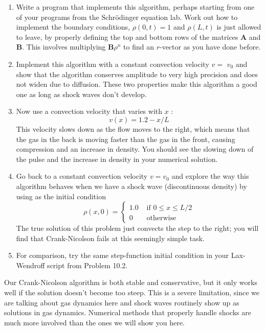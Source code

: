 \documentclass{book}
\theoremstyle{plain}
\theoremstyle{definition}
\numberwithin{exm}{chapter}
\theoremstyle{remark}
\theoremstyle{summary}
\theoremstyle{overview}
\begin{document}
\begin{enumerate}[label=(\alph*)]
\item  Write a program that implements this algorithm, perhaps starting from one of your programs from the Schr{\"o}dinger equation lab. Work out how to implement the boundary conditions, $\rho(0, t)=1$ and $\rho(L, t)$ is just allowed to leave, by properly defining the top and bottom rows of the matrices $\mathbf{A}$ and $\mathbf{B}$. This involves multiplying $\mathbf{B} \rho^{n}$ to find an $r$-vector as you have done before.
\item  Implement this algorithm with a constant convection velocity $v=$ $v_{0}$ and show that the algorithm conserves amplitude to very high precision and does not widen due to diffusion. These two properties make this algorithm a good one as long as shock waves don\rq t develop.
\item Now use a convection velocity that varies with $x$ :
\begin{equation}\label{eq:1019}
v(x)=1.2-x / L
\end{equation}
This velocity slows down as the flow moves to the right, which means
that the gas in the back is moving faster than the gas in the front,
causing compression and an increase in density. You should see the
slowing down of the pulse and the increase in density in your numerical solution.
\item Go back to a constant convection velocity $v = v_0$ and explore the way
this algorithm behaves when we have a shock wave (discontinuous
density) by using as the initial condition
\begin{equation}\label{eq:1020}
\rho(x, 0)= \begin{cases}1.0 & \text { if } 0 \leq x \leq L / 2 \\ 0 & \text { otherwise }\end{cases}
\end{equation}
The true solution of this problem just convects the step to the right;
you will find that Crank-Nicolson fails at this seemingly simple task.
\item For comparison, try the same step-function initial condition in your
Lax-Wendroff script from Problem 10.2.
\end{enumerate}
Our Crank-Nicolson algorithm is both stable and conservative, but it only
works well if the solution doesn\rq t become too steep. This is a severe limitation,
since we are talking about gas dynamics here and shock waves routinely show up
as solutions in gas dynamics. Numerical methods that properly handle shocks
are much more involved than the ones we will show you here.
\end{document}

